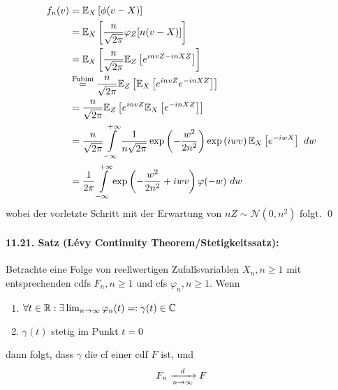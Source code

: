 \documentclass[11pt]{report}
\begin{document}
\begin{align*}
    f_n(v)&=\E_X\left[\phi(v-X)\right]\\
    &=\E_X\left[\dfrac{n}{\sqrt{2\pi}}\varphi_Z[n(v-X)]\right] \\
    &=\E_X\left[\dfrac{n}{\sqrt{2\pi}}\E_Z\left[e^{invZ-inXZ}\right]\right]\\
    &\overset{\text{Fubini}}{=}\dfrac{n}{\sqrt{2\pi}}\E_Z\left[\E_X\left[e^{invZ}e^{-inXZ}\right]\right]\\
    &=\dfrac{n}{\sqrt{2\pi}}\E_Z\left[e^{invZ}\E_X\left[e^{-inXZ}\right]\right] \\
    &=\dfrac{n}{\sqrt{2\pi}}\int\displaylimits_{-\infty}^{+\infty}\dfrac{1}{n\sqrt{2\pi}}\exp\left(-\dfrac{w^2}{2n^2}\right)\exp\left(iwv\right)\E_X\left[e^{-iwX}\right] \ dw \\
    &=\dfrac{1}{2\pi}\int\displaylimits_{-\infty}^{+\infty}\exp\left(-\dfrac{w^2}{2n^2}+iwv\right)\varphi(-w)\ dw
\end{align*}
wobei der vorletzte Schritt mit der Erwartung von $nZ\sim\mathcal{N}(0,n^2)$ folgt. \qed

\paragraph{11.21. Satz (L\'evy Continuity Theorem/Stetigkeitssatz):} Betrachte eine Folge von reellwertigen Zufallsvariablen $X_n,n\geq1$ mit entsprechenden cdfs $F_n,n\geq1$ und cfs $\varphi_n,n\geq1$. Wenn
\begin{enumerate}[label=(\roman*)]
    \item $\forall t\in\mathbb{R}: \exists\lim_{n\to\infty}\varphi_n(t)=:\gamma(t)\in\mathbb{C}$
    \item $\gamma(t)$ stetig im Punkt $t=0$
\end{enumerate}
dann folgt, dass $\gamma$ die cf einer cdf $F$ ist, und
$$F_n\nto{d}{n\to\infty}F$$

\end{document}
